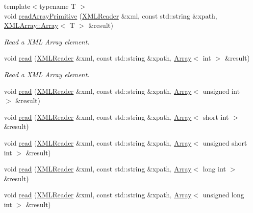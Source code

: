 \begin{DoxyCompactItemize}
\item 
{\footnotesize template$<$typename T $>$ }\\void \mbox{\hyperlink{namespaceADATXML_aaefbc18d9018a09271e0b949526730ab}{read\+Array\+Primitive}} (\mbox{\hyperlink{classADATXML_1_1XMLReader}{X\+M\+L\+Reader}} \&xml, const std\+::string \&xpath, \mbox{\hyperlink{classXMLArray_1_1Array}{X\+M\+L\+Array\+::\+Array}}$<$ T $>$ \&result)
\begin{DoxyCompactList}\small\item\em Read a X\+ML Array element. \end{DoxyCompactList}\item 
void \mbox{\hyperlink{group__io_gaeaed8077b8bee4f4277ea0cc8cc13744}{read}} (\mbox{\hyperlink{classADATXML_1_1XMLReader}{X\+M\+L\+Reader}} \&xml, const std\+::string \&xpath, \mbox{\hyperlink{classXMLArray_1_1Array}{Array}}$<$ int $>$ \&result)
\begin{DoxyCompactList}\small\item\em Read a X\+ML Array element. \end{DoxyCompactList}\item 
void \mbox{\hyperlink{group__io_ga2eaf76c05e59884bd34813884eef708b}{read}} (\mbox{\hyperlink{classADATXML_1_1XMLReader}{X\+M\+L\+Reader}} \&xml, const std\+::string \&xpath, \mbox{\hyperlink{classXMLArray_1_1Array}{Array}}$<$ unsigned int $>$ \&result)
\item 
void \mbox{\hyperlink{group__io_gaa9246e7914f16a84371b00a4910a535a}{read}} (\mbox{\hyperlink{classADATXML_1_1XMLReader}{X\+M\+L\+Reader}} \&xml, const std\+::string \&xpath, \mbox{\hyperlink{classXMLArray_1_1Array}{Array}}$<$ short int $>$ \&result)
\item 
void \mbox{\hyperlink{group__io_ga778f9eca273d2180afff1ba58606a153}{read}} (\mbox{\hyperlink{classADATXML_1_1XMLReader}{X\+M\+L\+Reader}} \&xml, const std\+::string \&xpath, \mbox{\hyperlink{classXMLArray_1_1Array}{Array}}$<$ unsigned short int $>$ \&result)
\item 
void \mbox{\hyperlink{group__io_ga28f3bc5eedbefea7d81064c339e72f97}{read}} (\mbox{\hyperlink{classADATXML_1_1XMLReader}{X\+M\+L\+Reader}} \&xml, const std\+::string \&xpath, \mbox{\hyperlink{classXMLArray_1_1Array}{Array}}$<$ long int $>$ \&result)
\item 
void \mbox{\hyperlink{group__io_gae84bf39f198c8718403a15bc408a09a1}{read}} (\mbox{\hyperlink{classADATXML_1_1XMLReader}{X\+M\+L\+Reader}} \&xml, const std\+::string \&xpath, \mbox{\hyperlink{classXMLArray_1_1Array}{Array}}$<$ unsigned long int $>$ \&result)

\end{DoxyCompactItemize}
